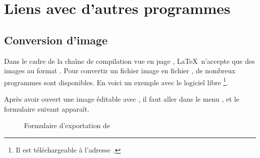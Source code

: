 
\chapter{Liens avec d'autres programmes}

\section{Conversion d'image}  \label{conversionimage}

Dans le cadre de la chaîne de compilation  vue en page \pageref{compilations}, \LaTeX\ n'accepte que des images au format . Pour convertir un fichier image en fichier , de nombreux programmes sont disponibles. En voici un exemple avec le logiciel libre \footnote{Il est téléchargeable à l'adresse .}.

Après avoir ouvert une image éditable avec , il faut aller dans le menu ,  et le formulaire suivant apparaît. 

\begin{figure}[H]
\centering
{}
\caption{Formulaire d'exportation de }
\end{figure}

